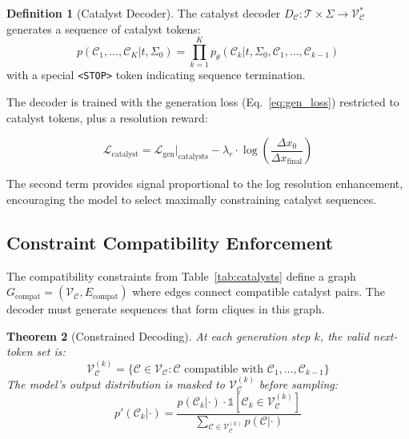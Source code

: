 \documentclass[11pt,a4paper]{article}
\newtheorem{theorem}{Theorem}[section]
\theoremstyle{definition}
\newtheorem{definition}[theorem]{Definition}
\theoremstyle{remark}
\newcommand{\Sig}{\Sigma}
\newcommand{\catalyst}{\mathcal{C}}
\newcommand{\loss}{\mathcal{L}}
\newcommand{\params}{\theta}
\newcommand{\vocab}{\mathcal{V}}
\begin{document}
\begin{definition}[Catalyst Decoder]
\label{def:catalyst_decoder}
The catalyst decoder $D_\catalyst: \mathcal{T} \times \Sig \to \vocab_\catalyst^*$ generates a sequence of catalyst tokens:
\begin{equation}
p(\catalyst_1, \ldots, \catalyst_K | t, \Sig_0) = \prod_{k=1}^{K} p_\params(\catalyst_k | t, \Sig_0, \catalyst_1, \ldots, \catalyst_{k-1})
\end{equation}
with a special \texttt{<STOP>} token indicating sequence termination.
\end{definition}

The decoder is trained with the generation loss (Eq.~\ref{eq:gen_loss}) restricted to catalyst tokens, plus a resolution reward:

\begin{equation}
\loss_{\text{catalyst}} = \loss_{\text{gen}}|_{\text{catalysts}} - \lambda_r \cdot \log\left(\frac{\Delta x_0}{\Delta x_{\mathrm{final}}}\right)
\end{equation}

The second term provides signal proportional to the log resolution enhancement, encouraging the model to select maximally constraining catalyst sequences.

\subsection{Constraint Compatibility Enforcement}

The compatibility constraints from Table~\ref{tab:catalysts} define a graph $G_{\text{compat}} = (\vocab_\catalyst, E_{\text{compat}})$ where edges connect compatible catalyst pairs. The decoder must generate sequences that form cliques in this graph.

\begin{theorem}[Constrained Decoding]
\label{thm:constrained_decoding}
At each generation step $k$, the valid next-token set is:
\begin{equation}
\vocab_\catalyst^{(k)} = \{\catalyst \in \vocab_\catalyst : \catalyst \text{ compatible with } \catalyst_1, \ldots, \catalyst_{k-1}\}
\end{equation}
The model's output distribution is masked to $\vocab_\catalyst^{(k)}$ before sampling:
\begin{equation}
p'(\catalyst_k | \cdot) = \frac{p(\catalyst_k | \cdot) \cdot \mathbb{1}[\catalyst_k \in \vocab_\catalyst^{(k)}]}{\sum_{\catalyst \in \vocab_\catalyst^{(k)}} p(\catalyst | \cdot)}
\end{equation}
\end{theorem}
\end{document}
